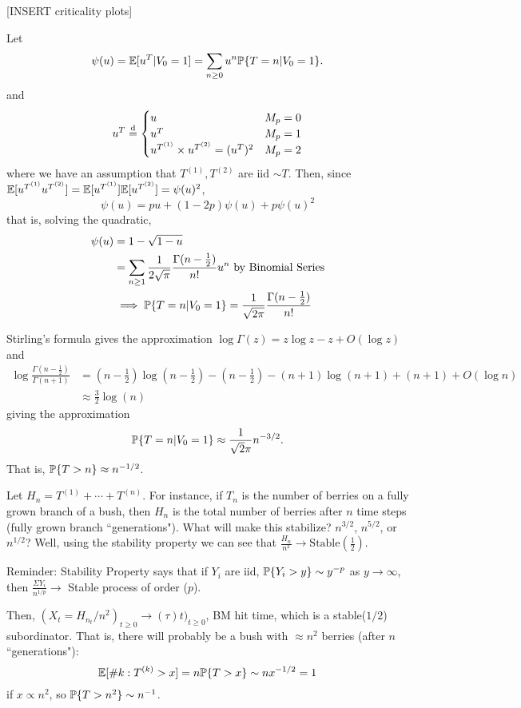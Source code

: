 \documentclass[../../../Master/AppliedStochastics.tex]{subfiles}
\begin{document}
[INSERT criticality plots]

\bigskip{}
\noindent{}Let 
$$
\psi (u) = \E [u^T | V_0 = 1 ] = \sum_{n \geq 0} u^n \P \{ T = n | V_0 = 1 \}.
$$ 
and
$$
u^T \disteq 
\begin{cases}
u &  M_p = 0 \\
u^T	&	M_p = 1\\
u^{T^{(1)}} \times u^{T^{(2)}} = (u^T)^2	&	M_p = 2
\end{cases}
$$
where we have an assumption that $T^{(1)}, T^{(2)}$ are iid $\sim T$. Then, 
since $\E [ u^{T^{(1)}} u^{T^{(2)}} ] = \E [ u^{T^{(1)}} ] \E 
[u^{T^{(2)}} ]  = \psi(u)^2$, 
$$
\psi(u) = pu + (1-2p) \psi(u) + p \psi(u)^2
$$
that is, solving the quadratic,
\begin{align*}
\psi(u) 
	&= 1 - \sqrt{1 - u} \\
	&= \sum_{n \geq 1} \frac{1}{2 \sqrt{\pi}} \frac{ \Gamma (n - \tfrac{1}{2}) 
	}{n!} u^n \text{ by Binomial Series} \\
	&\implies \P \{ T = n | V_0 = 1 \} = \frac{1}{ \sqrt{2 \pi} } \frac{ \Gamma 
	(n - \tfrac{1}{2}) }{n!}
\end{align*}

Stirling's formula gives the approximation $
\log \Gamma(z) 
	= z \log z - z + O(\log z)
$
and
\begin{align*}
\log \frac{ \Gamma(n - \tfrac{1}{2}) }{ \Gamma(n+1) }
	&= (n-\tfrac{1}{2}) \log (n - \tfrac{1}{2}) - (n - \tfrac{1}{2}) - (n+1) 
	\log (n+1) + (n+1) + O(\log n) \\
	&\approx \tfrac{3}{2} \log (n)
\end{align*}
giving the approximation 
$$
\P \{ T = n | V_0 = 1 \} \approx  \frac{1}{\sqrt{2} \pi} n^{-3/2}.
$$ 
That is, $\P \{ T > n \} \approx n^{-1/2}$. \newline{}

\noindent{}Let $H_n = T^{(1)} + \cdots + T^{(n)}$. For instance, if $T_n$ is 
the number of berries on a fully grown branch of a bush, then $H_n$ is the 
total number of berries after $n$ time steps (fully grown branch 
``generations"). What will make this stabilize? $n^{3/2}$, $n^{5/2}$, or 
$n^{1/2}$? Well, using the stability property we can see that $\frac{H_n}{n^2} 
\to \text{Stable}(\tfrac{1}{2})$.

\bigskip{}

Reminder: Stability Property says that if $Y_i$ are iid, $\P \{ Y_i > y \} \sim 
y^{-p}$ as $y \to \infty$, then $\frac{\Sigma Y_i}{n^{1/p}} \to$ Stable process 
of order ($p$). 

\bigskip{}

Then, $\left(X_t = H_{n_t} / n^2 \right)_{t \geq 0} \to (\tau)t )_{t \geq 0}$, 
BM hit time, which is a stable($1/2$) subordinator. That is, there will 
probably be a bush with $\approx n^2$ berries (after $n$ ``generations"):
$$
\E [ \# k : T^{(k)} > x] = n \P \{ T > x \} \sim n x^{-1/2} = 1
$$
if $x \propto n^2$, so $\P \{ T > n^2 \} \sim n^{-1}$.


%
\end{document}
